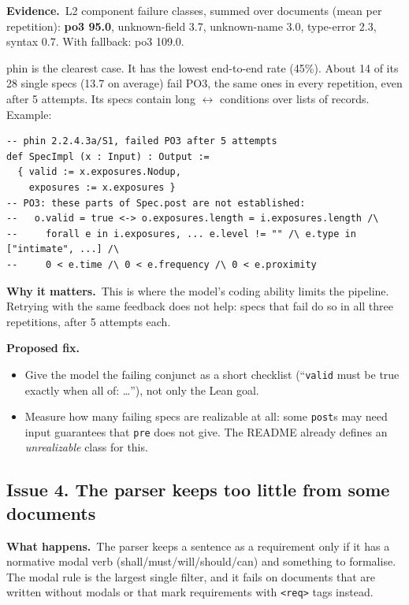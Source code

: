 \documentclass[10pt,a4paper]{article}
\newcommand{\code}[1]{\texttt{\small #1}}
\newcommand{\what}{\par\smallskip\textbf{What happens.}~}
\newcommand{\evidence}{\par\smallskip\textbf{Evidence.}~}
\newcommand{\why}{\par\smallskip\textbf{Why it matters.}~}
\newcommand{\fix}{\par\smallskip\textbf{Proposed fix.}~}
\begin{document}
\evidence L2 component failure classes, summed over documents (mean per repetition): \textbf{po3 95.0}, unknown-field 3.7,
unknown-name 3.0, type-error 2.3, syntax 0.7. With fallback: po3 109.0.

phin is the clearest case. It has the lowest end-to-end rate (45\%). About 14 of its 28 single specs (13.7 on average) fail
PO3, the same ones in every repetition, even after 5 attempts. Its specs contain long $\leftrightarrow$ conditions over lists
of records. Example:
\begin{lstlisting}
-- phin 2.2.4.3a/S1, failed PO3 after 5 attempts
def SpecImpl (x : Input) : Output :=
  { valid := x.exposures.Nodup,
    exposures := x.exposures }
-- PO3: these parts of Spec.post are not established:
--   o.valid = true <-> o.exposures.length = i.exposures.length /\
--     forall e in i.exposures, ... e.level != "" /\ e.type in ["intimate", ...] /\
--     0 < e.time /\ 0 < e.frequency /\ 0 < e.proximity
\end{lstlisting}

\why This is where the model's coding ability limits the pipeline. Retrying with the same feedback does not help: specs that
fail do so in all three repetitions, after 5 attempts each.

\fix
\begin{itemize}
\item Give the model the failing conjunct as a short checklist (``\code{valid} must be true exactly when all of: \dots''),
      not only the Lean goal.
\item Measure how many failing specs are realizable at all: some \code{post}s may need input guarantees that \code{pre} does
      not give. The README already defines an \emph{unrealizable} class for this.
\end{itemize}

\subsection*{Issue 4. The parser keeps too little from some documents}
\what The parser keeps a sentence as a requirement only if it has a normative modal verb (shall/must/will/should/can) and
something to formalise. The modal rule is the largest single filter, and it fails on documents that are written without
modals or that mark requirements with \code{<req>} tags instead.
\end{document}
